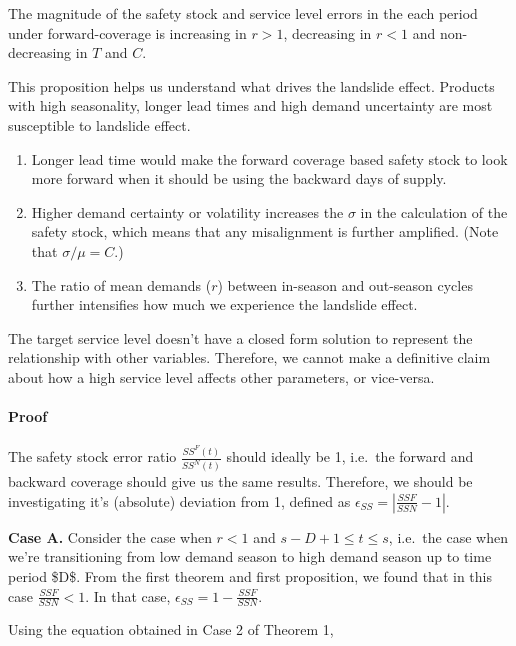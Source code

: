 \documentclass[,msom,nonblindrev]{informs}
\providecommand{\tightlist}{%
  \setlength{\itemsep}{0pt}\setlength{\parskip}{0pt}}
\begin{document}
The magnitude of the safety stock and service level errors in the each
period under forward-coverage is increasing in \(r>1\), decreasing in
\(r<1\) and non-decreasing in \(T\) and \(C\).

This proposition helps us understand what drives the landslide effect.
Products with high seasonality, longer lead times and high demand
uncertainty are most susceptible to landslide effect.

\begin{enumerate}
\def\labelenumi{\arabic{enumi}.}
\tightlist
\item
  Longer lead time would make the forward coverage based safety stock to
  look more forward when it should be using the backward days of supply.
\item
  Higher demand certainty or volatility increases the \(\sigma\) in the
  calculation of the safety stock, which means that any misalignment is
  further amplified. (Note that \(\sigma/\mu = C\).)
\item
  The ratio of mean demands (\(r\)) between in-season and out-season
  cycles further intensifies how much we experience the landslide
  effect.
\end{enumerate}

The target service level doesn't have a closed form solution to
represent the relationship with other variables. Therefore, we cannot
make a definitive claim about how a high service level affects other
parameters, or vice-versa.

\hypertarget{proof-3}{%
\paragraph{Proof}\label{proof-3}}

The safety stock error ratio \(\frac{SS^F(t)}{SS^N(t)}\) should ideally
be 1, i.e.~the forward and backward coverage should give us the same
results. Therefore, we should be investigating it's (absolute) deviation
from 1, defined as
\(\epsilon_{SS} = \left| \frac{SSF}{SSN} - 1 \right|\).

\textbf{Case A.} Consider the case when \(r<1\) and
\(s-D+1 \leq t \leq s\), i.e.~the case when we're transitioning from low
demand season to high demand season up to time period \$D\$. From the
first theorem and first proposition, we found that in this case
\(\frac{SSF}{SSN} < 1\). In that case,
\(\epsilon_{SS} = 1-\frac{SSF}{SSN}\).

Using the equation obtained in Case 2 of Theorem 1,
\end{document}
